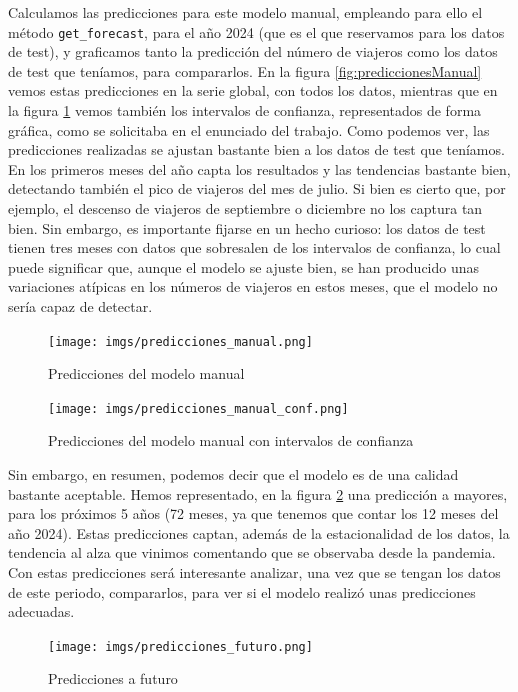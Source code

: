 \documentclass[a4paper,onecolumn]{extarticle}
\begin{document}
\begin{sloppypar}
Calculamos las predicciones para este modelo manual, empleando para ello el método \texttt{get\_forecast}, para el año 2024 (que es el que reservamos para los 
datos de test), y graficamos tanto la predicción del número de viajeros como los datos de test que teníamos, para compararlos. En la figura \ref{fig:prediccionesManual} 
vemos estas predicciones en la serie global, con todos los datos, mientras que en la figura \ref{fig:prediccionesManualConf} vemos también los intervalos de 
confianza, representados de forma gráfica, como se solicitaba en el enunciado del trabajo. Como podemos ver, las predicciones realizadas se ajustan bastante 
bien a los datos de test que teníamos. En los primeros meses del año capta los resultados y las tendencias bastante bien, detectando también el pico de viajeros 
del mes de julio. Si bien es cierto que, por ejemplo, el descenso de viajeros de septiembre o diciembre no los captura tan bien. Sin embargo, es importante 
fijarse en un hecho curioso: los datos de test tienen tres meses con datos que sobresalen de los intervalos de confianza, lo cual puede significar que, aunque 
el modelo se ajuste bien, se han producido unas variaciones atípicas en los números de viajeros en estos meses, que el modelo no sería capaz de detectar. 
\begin{center}
    \begin{figure}[h!]
        \centering
        \begin{minipage}{0.45\textwidth}
            \centering
            \texttt{[image: imgs/predicciones\_manual.png]}
            \caption{Predicciones del modelo manual}
            \label{fig:prediccionesManual}
        \end{minipage}
        \hspace{0.005\textwidth} %
        \begin{minipage}{0.5\textwidth}
            \centering
            \texttt{[image: imgs/predicciones\_manual\_conf.png]}
            \caption{Predicciones del modelo manual con intervalos de confianza}
            \label{fig:prediccionesManualConf}
        \end{minipage}
    \end{figure}
\end{center}

Sin embargo, en resumen, podemos decir que el modelo es de una calidad bastante aceptable. Hemos representado, en la figura \ref{fig:predicciones_futuro} una 
predicción a mayores, para los próximos 5 años (72 meses, ya que tenemos que contar los 12 meses del año 2024). Estas predicciones captan, además de la 
estacionalidad de los datos, la tendencia al alza que vinimos comentando que se observaba desde la pandemia. Con estas predicciones será interesante analizar, 
una vez que se tengan los datos de este periodo, compararlos, para ver si el modelo realizó unas predicciones adecuadas.
\begin{center}
    \begin{figure}[h!]
        \centering
        \texttt{[image: imgs/predicciones\_futuro.png]}
        \caption{Predicciones a futuro} \label{fig:predicciones_futuro}
    \end{figure}
\end{center}


\end{sloppypar}
\end{document}
